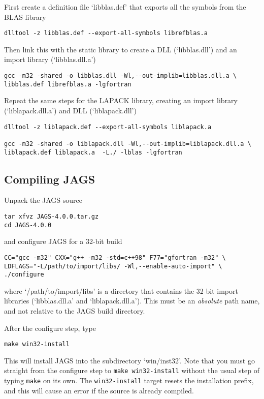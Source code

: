 \documentclass[11pt, a4paper, titlepage]{article}
\newcommand{\JAGS}{\textsf{JAGS}}
\newcommand{\file}[1]{{`\normalfont\textsf{#1}'}}
\begin{document}
First create a definition file \file{libblas.def} that exports all the
symbols from the BLAS library
\begin{verbatim}
dlltool -z libblas.def --export-all-symbols librefblas.a
\end{verbatim}
Then link this with the static library to create a DLL
(\file{libblas.dll}) and an import library (\file{libblas.dll.a})
\begin{verbatim}
gcc -m32 -shared -o libblas.dll -Wl,--out-implib=libblas.dll.a \
libblas.def librefblas.a -lgfortran 
\end{verbatim}
 
Repeat the same steps for the LAPACK library, creating an import library
(\file{liblapack.dll.a}) and DLL (\file{liblapack.dll})
\begin{verbatim}
dlltool -z liblapack.def --export-all-symbols liblapack.a

gcc -m32 -shared -o liblapack.dll -Wl,--out-implib=liblapack.dll.a \
liblapack.def liblapack.a  -L./ -lblas -lgfortran 
\end{verbatim}

\subsection{Compiling \JAGS}

Unpack the JAGS source
\begin{verbatim}
tar xfvz JAGS-4.0.0.tar.gz
cd JAGS-4.0.0
\end{verbatim}
and configure JAGS for a 32-bit build
\begin{verbatim}
CC="gcc -m32" CXX="g++ -m32 -std=c++98" F77="gfortran -m32" \
LDFLAGS="-L/path/to/import/libs/ -Wl,--enable-auto-import" \
./configure
\end{verbatim}
where \file{/path/to/import/libs} is a directory that contains the
32-bit import libraries (\file{libblas.dll.a} and
\file{liblapack.dll.a}).  This must be an {\em absolute} path name,
and not relative to the JAGS build directory.


After the configure step, type
\begin{verbatim}
make win32-install
\end{verbatim}
This will install JAGS into the subdirectory \file{win/inst32}.
Note that you must go straight from the configure step to \texttt{make
  win32-install} without the usual step of typing \texttt{make} on
its own.  The \texttt{win32-install} target resets the installation
prefix, and this will cause an error if the source is already
compiled.
\end{document}
